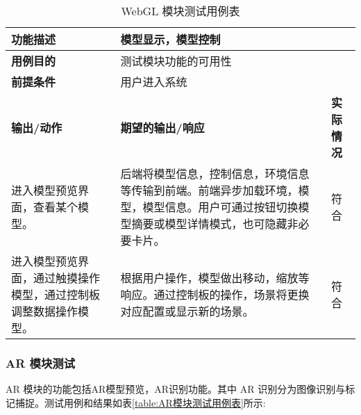 \begin{table}[H]
  \centering
  \small
  \renewcommand\arraystretch{1.1}
  \caption{WebGL 模块测试用例表}
  \label{table:WebGL 模块测试用例表}
  \setlength{\tabcolsep}{4mm}
  \begin{tabular}{|p{4.5cm}|p{6.5cm}|p{1.5cm}|}
    \hline \textbf{功能描述} & \multicolumn{2}{l|}{模型显示，模型控制} \\
    \hline \textbf{用例目的} & \multicolumn{2}{l|}{测试模块功能的可用性} \\
    \hline \textbf{前提条件} & \multicolumn{2}{l|}{用户进入系统} \\
    \hline \textbf{输出/动作} & \textbf{期望的输出/响应} & \textbf{实际情况} \\
    \hline 进入模型预览界面，查看某个模型。 & 后端将模型信息，控制信息，环境信息等传输到前端。前端异步加载环境，模型，模型信息。用户可通过按钮切换模型摘要或模型详情模式，也可隐藏非必要卡片。 & 符合  \\
    \hline 进入模型预览界面，通过触摸操作模型，通过控制板调整数据操作模型。 & 根据用户操作，模型做出移动，缩放等响应。通过控制板的操作，场景将更换对应配置或显示新的场景。 & 符合  \\
    \hline
  \end{tabular}
\end{table}

\subsubsection{AR 模块测试}

AR 模块的功能包括AR模型预览，AR识别功能。其中 AR 识别分为图像识别与标记捕捉。测试用例和结果如表\ref{table:AR模块测试用例表}所示:

